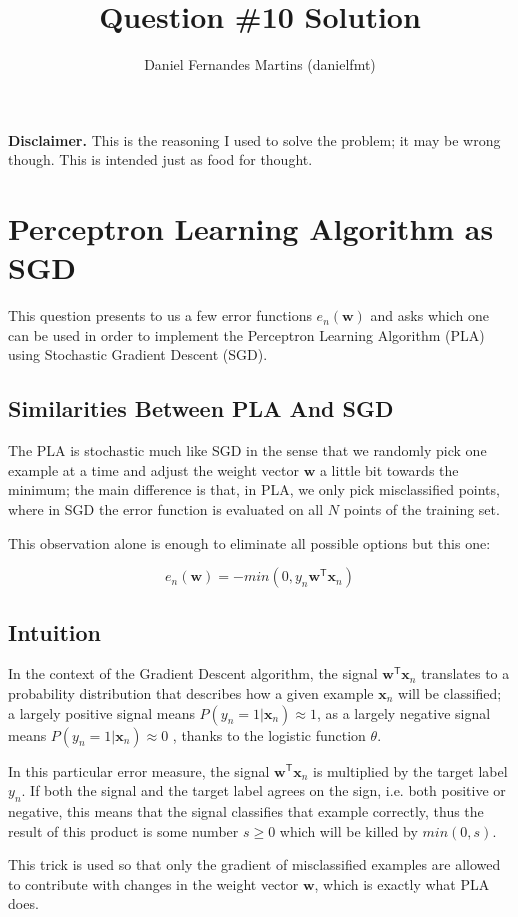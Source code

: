 \documentclass{article}
\author{Daniel Fernandes Martins (danielfmt)}
\title{Question \#10 Solution}
\begin{document}
\maketitle

\textbf{Disclaimer.} This is the reasoning I used to solve the problem; it
may be wrong though. This is intended just as food for thought.

\section{Perceptron Learning Algorithm as SGD}

This question presents to us a few error functions $e_n(\mathbf{w})$ and asks
which one can be used in order to implement the Perceptron Learning Algorithm
(PLA) using Stochastic Gradient Descent (SGD).

\subsection{Similarities Between PLA And SGD}

The PLA is stochastic much like SGD in the sense that we randomly pick one
example at a time and adjust the weight vector $\mathbf{w}$ a little bit towards
the minimum; the main difference is that, in PLA, we only pick misclassified
points, where in SGD the error function is evaluated on all $N$ points of the
training set.

This observation alone is enough to eliminate all possible options but this one:

\begin{equation*}
  e_n(\mathbf{w}) = -min(0, y_n\mathbf{w}^\mathsf{T} \mathbf{x}_n)
\end{equation*}

\subsection{Intuition}

In the context of the Gradient Descent algorithm, the signal
$\mathbf{w}^\mathsf{T}\mathbf{x}_n$ translates to a probability distribution
that describes how a given example $\mathbf{x}_n$ will be classified; a largely
positive signal means $P(y_n=1 | \mathbf{x}_n) \approx 1$, as a largely negative
signal means $P(y_n=1 | \mathbf{x}_n) \approx 0$ , thanks to the logistic
function $\theta$.

In this particular error measure, the signal $\mathbf{w}^\mathsf{T}\mathbf{x}_n$
is multiplied by the target label $y_n$. If both the signal and the target
label agrees on the sign, i.e. both positive or negative, this means that the
signal classifies that example correctly, thus the result of this product is
some number $s \geq 0$ which will be killed by $min(0, s)$.

This trick is used so that only the gradient of misclassified examples are
allowed to contribute with changes in the weight vector $\mathbf{w}$,
which is exactly what PLA does.
\end{document}

